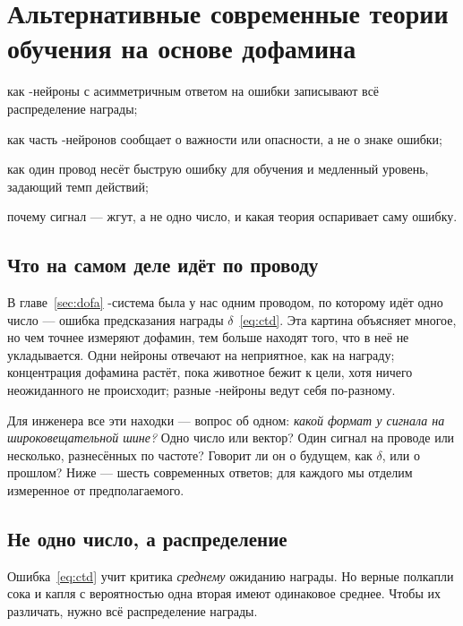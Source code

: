 \chapter{Альтернативные современные теории обучения на основе дофамина}
\label{sec:dofaalt}
\begin{chaptergoals}
\item как -нейроны с асимметричным ответом на ошибки записывают всё распределение награды;
\item как часть -нейронов сообщает о важности или опасности, а не о знаке ошибки;
\item как один провод несёт быструю ошибку для обучения и медленный уровень, задающий темп действий;
\item почему сигнал  --- жгут, а не одно число, и какая теория оспаривает саму ошибку.
\end{chaptergoals}

\section{Что на самом деле идёт по проводу}

В главе~\ref{sec:dofa} -система была у нас одним проводом, по которому идёт одно число --- ошибка предсказания награды $\delta$~\eqref{eq:ctd}. Эта картина объясняет многое, но чем точнее измеряют дофамин, тем больше находят того, что в неё не укладывается. Одни нейроны отвечают на неприятное, как на награду; концентрация дофамина растёт, пока животное бежит к цели, хотя ничего неожиданного не происходит; разные -нейроны ведут себя по-разному.

Для инженера все эти находки --- вопрос об одном: \emph{какой формат у сигнала на широковещательной шине?} Одно число или вектор? Один сигнал на проводе или несколько, разнесённых по частоте? Говорит ли он о будущем, как $\delta$, или о прошлом? Ниже --- шесть современных ответов; для каждого мы отделим измеренное от предполагаемого.

\section{Не одно число, а распределение}

Ошибка~\eqref{eq:ctd} учит критика \emph{среднему} ожиданию награды. Но верные полкапли сока и капля с вероятностью одна вторая имеют одинаковое среднее. Чтобы их различать, нужно всё распределение награды.

